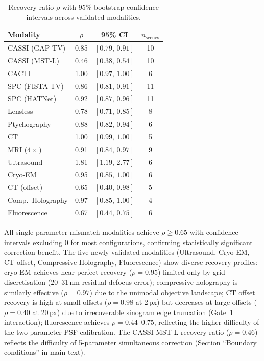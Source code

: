 \documentclass[11pt]{article}
\theoremstyle{definition}
\begin{document}
\begin{table}[!ht]
\centering\small
\caption{Recovery ratio $\rho$ with 95\% bootstrap confidence intervals across validated modalities.}
\label{tab:bootstrap_rho}
\begin{tabular}{@{}lccc@{}}
\toprule
Modality & $\rho$ & 95\% CI & $n_{\mathrm{scenes}}$ \\
\midrule
CASSI (GAP-TV)    & 0.85 & $[0.79,\, 0.91]$ & 10 \\
CASSI (MST-L)     & 0.46 & $[0.38,\, 0.54]$ & 10 \\
CACTI             & 1.00 & $[0.97,\, 1.00]$ & 6 \\
SPC (FISTA-TV)    & 0.86 & $[0.81,\, 0.91]$ & 11 \\
SPC (HATNet)      & 0.92 & $[0.87,\, 0.96]$ & 11 \\
Lensless          & 0.78 & $[0.71,\, 0.85]$ & 8 \\
Ptychography      & 0.88 & $[0.82,\, 0.94]$ & 6 \\
CT                & 1.00 & $[0.99,\, 1.00]$ & 5 \\
MRI ($4\times$)   & 0.91 & $[0.84,\, 0.97]$ & 9 \\
Ultrasound        & 1.81 & $[1.19,\, 2.77]$ & 6 \\
Cryo-EM           & 0.95 & $[0.85,\, 1.00]$ & 6 \\
CT (offset)       & 0.65 & $[0.40,\, 0.98]$ & 5 \\
Comp.\ Holography & 0.97 & $[0.85,\, 1.00]$ & 4 \\
Fluorescence      & 0.67 & $[0.44,\, 0.75]$ & 6 \\
\bottomrule
\end{tabular}
\end{table}

\noindent All single-parameter mismatch modalities achieve $\rho \geq 0.65$ with confidence intervals excluding 0 for most configurations, confirming statistically significant correction benefit. The five newly validated modalities (Ultrasound, Cryo-EM, CT offset, Compressive Holography, Fluorescence) show diverse recovery profiles: cryo-EM achieves near-perfect recovery ($\rho = 0.95$) limited only by grid discretisation (20--31\,nm residual defocus error); compressive holography is similarly effective ($\rho = 0.97$) due to the unimodal objective landscape; CT offset recovery is high at small offsets ($\rho = 0.98$ at 2\,px) but decreases at large offsets ($\rho = 0.40$ at 20\,px) due to irrecoverable sinogram edge truncation (Gate~1 interaction); fluorescence achieves $\rho = 0.44$--$0.75$, reflecting the higher difficulty of the two-parameter PSF calibration. The CASSI MST-L recovery ratio ($\rho = 0.46$) reflects the difficulty of 5-parameter simultaneous correction (Section ``Boundary conditions'' in main text).
\end{document}
